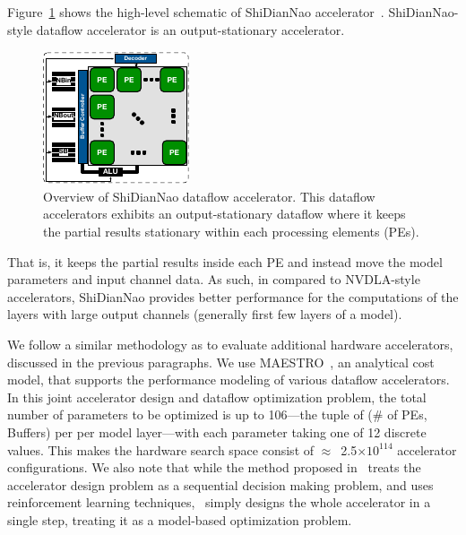%
Figure~\ref{fig:shi_dla} shows the high-level schematic of ShiDianNao accelerator~\citep{shidiannao}.
%
ShiDianNao-style dataflow accelerator is an output-stationary accelerator.
%
\begin{figure}[t!]
\centering
    \includegraphics[width=0.35\linewidth]{figs/accelerator/shidian.pdf}
    \caption{Overview of ShiDianNao dataflow accelerator. This dataflow accelerators exhibits an output-stationary dataflow where it keeps the partial results stationary within each processing elements (PEs).}
    \label{fig:shi_dla}
    \vspace{-0.1in} 
\end{figure}
That is, it keeps the partial results inside each PE and instead move the model parameters and input channel data. 
%
As such, in compared to NVDLA-style accelerators, ShiDianNao provides better performance for the computations of the layers with large output channels (generally first few layers of a model).

%
We follow a similar methodology as \citep{kao2020confuciux} to evaluate additional hardware accelerators, discussed in the previous paragraphs.
%
We use MAESTRO~\citep{maestro}, an analytical cost model, that supports the performance modeling of various dataflow accelerators.
%
In this joint accelerator design and dataflow optimization problem, the total number of parameters to be optimized is up to 106---the tuple of (\# of PEs, Buffers) per per model layer---with each parameter taking one of 12 discrete values. This makes the hardware search space consist of $\approx$~2.5$\times10^{114}$ accelerator configurations.
%
We also note that while the method proposed in~\citep{kao2020confuciux} treats the accelerator design problem as a sequential decision making problem, and uses reinforcement learning techniques, \primemethodname\ simply designs the whole accelerator in a single step, treating it as a model-based optimization problem.

